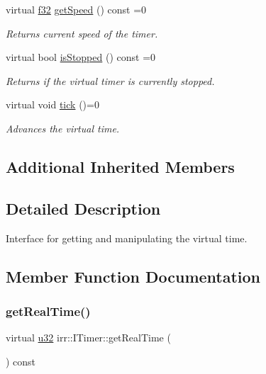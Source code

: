 \begin{DoxyCompactItemize}
virtual \hyperlink{namespaceirr_a0277be98d67dc26ff93b1a6a1d086b07}{f32} \hyperlink{classirr_1_1ITimer_ac2b3c1947d78e5bb9dc62f32edc4e1b2}{get\+Speed} () const =0
\begin{DoxyCompactList}\small\item\em Returns current speed of the timer. \end{DoxyCompactList}\item 
\mbox{\label{classirr_1_1ITimer_ac868245b9562f0c13b2e0ce127c48532}} 
virtual bool \hyperlink{classirr_1_1ITimer_ac868245b9562f0c13b2e0ce127c48532}{is\+Stopped} () const =0
\begin{DoxyCompactList}\small\item\em Returns if the virtual timer is currently stopped. \end{DoxyCompactList}\item 
virtual void \hyperlink{classirr_1_1ITimer_a50ee793711cace4410e1f9c9e1ce20c6}{tick} ()=0
\begin{DoxyCompactList}\small\item\em Advances the virtual time. \end{DoxyCompactList}\end{DoxyCompactItemize}
\subsection*{Additional Inherited Members}


\subsection{Detailed Description}
Interface for getting and manipulating the virtual time. 

\subsection{Member Function Documentation}
\mbox{\label{classirr_1_1ITimer_a67d6b3ae61c2e6aaad82c4ae15ab55f1}} 
\subsubsection{\texorpdfstring{get\+Real\+Time()}{getRealTime()}}
{\footnotesize\ttfamily virtual \hyperlink{namespaceirr_a0416a53257075833e7002efd0a18e804}{u32} irr\+::\+I\+Timer\+::get\+Real\+Time (\begin{DoxyParamCaption}{ }\end{DoxyParamCaption}) const\hspace{0.3cm}{\ttfamily [pure virtual]}}



